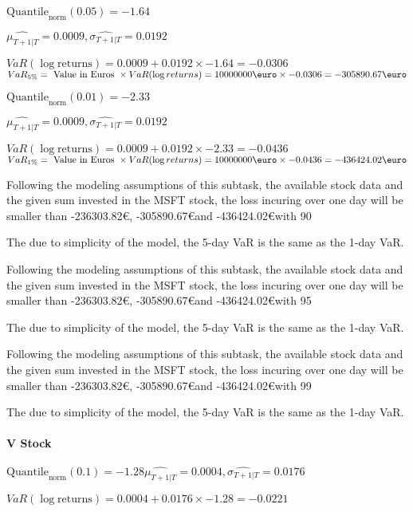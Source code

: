 $\text{Quantile}_\text{norm}(0.05) = -1.64$

$\hat{\mu_{T+1|T}} = 0.0009, \hat{\sigma_{T+1|T}} = 0.0192$

$VaR(\log \text{returns}) = 0.0009 + 0.0192\times-1.64 = -0.0306$
$VaR_{5\%} = \text{ Value in Euros } \times VaR(\log returns) = 10 000 000 \text{\euro} \times-0.0306 = -305890.67 \text{\euro}$


$\text{Quantile}_\text{norm}(0.01) = -2.33$

$\hat{\mu_{T+1|T}} = 0.0009, \hat{\sigma_{T+1|T}} = 0.0192$

$VaR(\log \text{returns}) = 0.0009 + 0.0192\times-2.33 = -0.0436$
$VaR_{1\%} = \text{ Value in Euros } \times VaR(\log returns) = 10 000 000 \text{\euro} \times-0.0436 = -436424.02 \text{\euro}$


Following the modeling assumptions of this subtask, the available stock data and the given sum invested in the MSFT stock, the loss incuring over one day will be smaller than -236303.82\euro, -305890.67\euro and -436424.02\euro with 90%


The due to simplicity of the model, the 5-day VaR is the same as the 1-day VaR.



Following the modeling assumptions of this subtask, the available stock data and the given sum invested in the MSFT stock, the loss incuring over one day will be smaller than -236303.82\euro, -305890.67\euro and -436424.02\euro with 95%


The due to simplicity of the model, the 5-day VaR is the same as the 1-day VaR.



Following the modeling assumptions of this subtask, the available stock data and the given sum invested in the MSFT stock, the loss incuring over one day will be smaller than -236303.82\euro, -305890.67\euro and -436424.02\euro with 99%


The due to simplicity of the model, the 5-day VaR is the same as the 1-day VaR.


\paragraph{V Stock}


$\text{Quantile}_\text{norm}(0.1) = -1.28
         \hat{\mu_{T+1|T}} = 0.0004, \hat{\sigma_{T+1|T}} = 0.0176$

$VaR(\log \text{returns}) = 0.0004 + 0.0176\times-1.28 = -0.0221$

